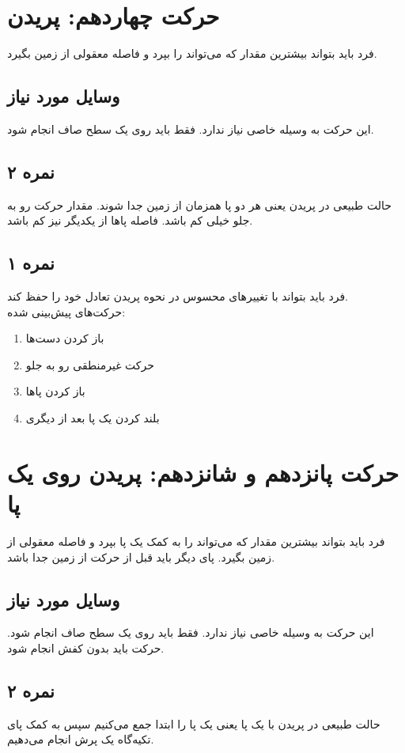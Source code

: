 \documentclass[12pt]{report}
\begin{document}
	\section*{حرکت چهاردهم: پریدن}
	فرد باید بتواند بیشترین مقدار که می‌تواند را بپرد و فاصله معقولی از زمین بگیرد.
	\subsection*{وسایل مورد نیاز}
	این حرکت به وسیله خاصی نیاز ندارد. فقط باید روی یک سطح صاف انجام شود. 
	\subsection*{نمره ۲}
	حالت طبیعی در پریدن یعنی هر دو پا همزمان از زمین جدا شوند. مقدار حرکت رو به جلو خیلی کم باشد. فاصله پاها از یکدیگر نیز کم باشد.
	\subsection*{نمره ۱}
	فرد باید بتواند با تغییر‌های محسوس در نحوه پریدن تعادل خود را حفظ کند.\\
	حرکت‌های پیش‌بینی شده:
	\begin{enumerate}
	\item باز کردن دست‌ها
	\item حرکت غیرمنطقی رو به جلو
	\item باز کردن پاها
	\item بلند کردن یک پا بعد از دیگری
	\end{enumerate}
	\newpage
	
	\section*{حرکت پانزدهم و شانزدهم: پریدن روی یک پا}
	فرد باید بتواند بیشترین مقدار که می‌تواند را به کمک یک پا بپرد و فاصله معقولی از زمین بگیرد. پای دیگر باید قبل از حرکت از زمین جدا باشد.
	\subsection*{وسایل مورد نیاز}
	این حرکت به وسیله خاصی نیاز ندارد. فقط باید روی یک سطح صاف انجام شود. حرکت باید بدون کفش انجام شود.
	\subsection*{نمره ۲}
	حالت طبیعی در پریدن با یک پا یعنی یک پا را ابتدا جمع می‌کنیم سپس به کمک پای تکیه‌گاه یک پرش انجام می‌دهیم.
\end{document}
